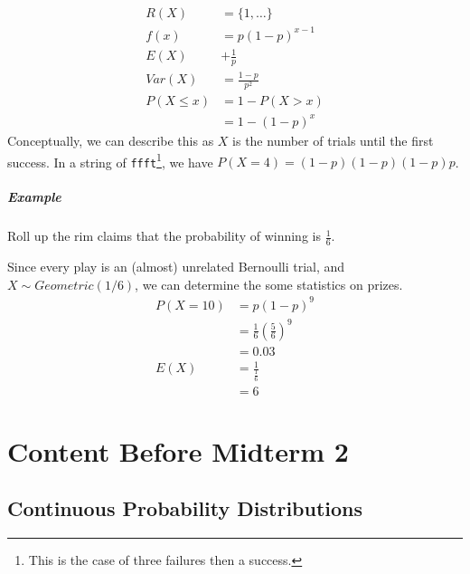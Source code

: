                 \begin{align*}
                    R(X) &= \{1, \ldots \} \\
                    f(x) &= p(1 - p)^{x - 1} \\
                    E(X) &+ \frac{1}{p} \\
                    Var(X) &= \frac{1 - p}{p^2} \\
                    P(X \le x) &= 1 - P(X > x) \\
                        &= 1 - (1 - p)^x
                \end{align*}
                Conceptually, we can describe this as $X$ is the number of trials until the first success.
                In a string of \verb|ffft|\footnote{This is the case of three failures then a success.}, we have $P(X = 4) = (1-p)(1-p)(1-p)p$.

                \subsubsection{Example} %
                \label{ssub:example}
                    Roll up the rim claims that the probability of winning is $\frac{1}{6}$.

                    Since every play is an (almost) unrelated Bernoulli trial, and $X \sim Geometric(1/6)$, we can determine the some statistics on prizes.
                    \begin{align*}
                        P(X = 10) &= p(1-p)^9 \\
                        &= \frac{1}{6} (\frac{5}{6})^9 \\
                        &= 0.03 \\
                        E(X) &= \frac{1}{\frac{1}{6}} \\
                        &= 6
                    \end{align*}

    \part{Content Before Midterm 2} %
    \label{prt:content_ _before_ _midterm_ _2_}
        \chapter{Continuous Probability Distributions} %
        \label{cha:continuous_probability_distributions}
